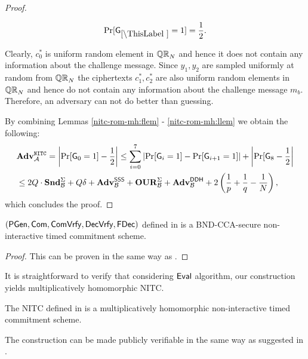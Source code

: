 \begin{proof}
\begin{lemma}\label{nitc-rom-mh:llem}
\[
\Pr[\games_\thisgame = 1] = \half.
\]
\end{lemma}

Clearly, $c_0^*$ is uniform random element in $\mathbb{QR}_N$ and hence it does not contain any information about the challenge message. Since $y_1, y_2$ are sampled uniformly at random from $\mathbb{QR}_N$ the ciphertexts $c_1^*, c_2^*$ are also uniform random elements in $\mathbb{QR}_N$ and hence do not contain any information about the challenge message $m_b$. Therefore, an adversary can not do better than guessing.

By combining Lemmas \ref{nitc-rom-mh:flem} - \ref{nitc-rom-mh:llem} we obtain the following:
\begin{align*}
&\mathbf{Adv}^{\mathtt{NITC}}_{\mathcal{A}} = \left| \Pr[\mathsf{G}_0 = 1] - \frac{1}{2} \right| \leq \sum_{i=0}^7 \left|\Pr[\mathsf{G}_i = 1] - \Pr[\mathsf{G}_{i+1} = 1] \right| + \left|\Pr[\mathsf{G}_{8}- \frac{1}{2}\right| \\
 &\leq 2Q \cdot \mathbf{Snd}^\Sigma_{\mathcal{B}} + Q\delta + \mathbf{Adv}^{\mathsf{SSS}}_{\mathcal{B}} + \mathbf{OUR}^\Sigma_{\mathcal{B}} + \mathbf{Adv}^{\mathsf{DDH}}_{\mathcal{B}} + 2 \left( \frac{1}{p}+\frac{1}{q}-\frac{1}{N} \right),
\end{align*}
which concludes the proof.
\end{proof}



\begin{theorem}
$(\mathsf{PGen}, \mathsf{Com}, \mathsf{ComVrfy}, \mathsf{DecVrfy}, \mathsf{FDec})$ defined in  is a BND-CCA-secure non-interactive timed commitment scheme. 
\end{theorem}

\begin{proof}
This can be proven in the same way as .
\end{proof}

It is straightforward to verify that considering $\mathsf{Eval}$ algorithm, our construction yields multiplicatively homomorphic NITC. 
\begin{theorem}\label{hom-mh-rom}
The NITC \mathlist{(\pgen, \com, \cvrfy, \dvrfy, \fdecom, \fdvrfy, \eval)} defined in  is a multiplicatively homomorphic non-interactive timed commitment scheme.
\end{theorem}


\begin{remark}
The construction can be made publicly verifiable in the same way as suggested in . 
 \end{remark}


